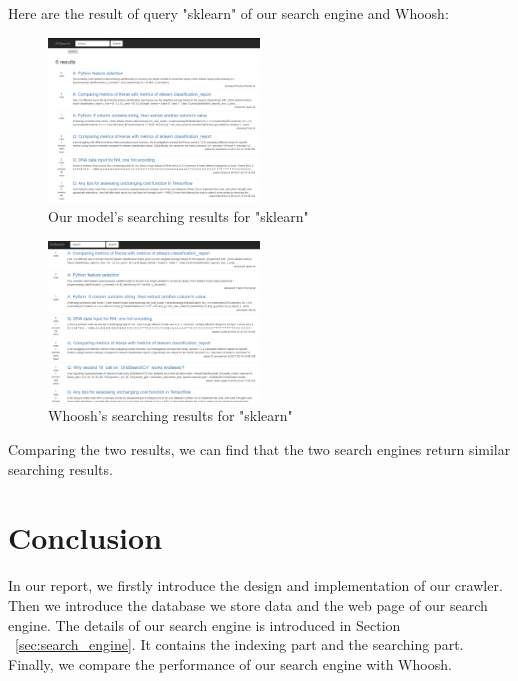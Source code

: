 \documentclass[10pt,journal,compsoc]{IEEEtran}
\begin{document}
Here are the result of query "sklearn" of our search engine and Whoosh:\\
\begin{figure}[H]
  \centering
    \includegraphics[width=0.5\textwidth]{images/testsklearn.png}
    \caption{Our model's searching results for "sklearn"}
\end{figure}

\begin{figure}[H]
  \centering
    \includegraphics[width=0.5\textwidth]{images/whooshsklearn.png}
    \caption{Whoosh's searching results for "sklearn"}
\end{figure}

Comparing the two results, we can find that the two search engines return similar searching results.

\section{Conclusion}
\label{sec:conclusion}

In our report, we firstly introduce the design and implementation of our crawler. Then we introduce the database we store data and the web page of our search engine. The details of our search engine is introduced in Section ~\ref{sec:search_engine}. It contains the indexing part and the searching part. Finally, we compare the performance of our search engine with Whoosh.

\end{document}
